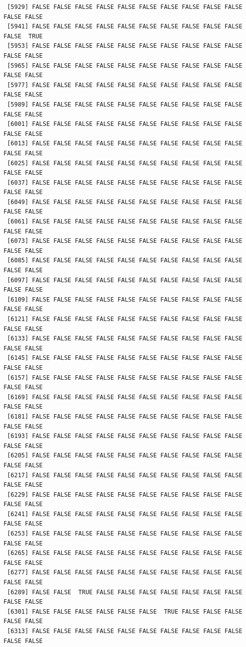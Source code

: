 \documentclass[
  a4paper,
  DIV=11,
  numbers=noendperiod]{scrartcl}
\begin{document}
\begin{verbatim}
 [5929] FALSE FALSE FALSE FALSE FALSE FALSE FALSE FALSE FALSE FALSE FALSE FALSE
 [5941] FALSE FALSE FALSE FALSE FALSE FALSE FALSE FALSE FALSE FALSE FALSE  TRUE
 [5953] FALSE FALSE FALSE FALSE FALSE FALSE FALSE FALSE FALSE FALSE FALSE FALSE
 [5965] FALSE FALSE FALSE FALSE FALSE FALSE FALSE FALSE FALSE FALSE FALSE FALSE
 [5977] FALSE FALSE FALSE FALSE FALSE FALSE FALSE FALSE FALSE FALSE FALSE FALSE
 [5989] FALSE FALSE FALSE FALSE FALSE FALSE FALSE FALSE FALSE FALSE FALSE FALSE
 [6001] FALSE FALSE FALSE FALSE FALSE FALSE FALSE FALSE FALSE FALSE FALSE FALSE
 [6013] FALSE FALSE FALSE FALSE FALSE FALSE FALSE FALSE FALSE FALSE FALSE FALSE
 [6025] FALSE FALSE FALSE FALSE FALSE FALSE FALSE FALSE FALSE FALSE FALSE FALSE
 [6037] FALSE FALSE FALSE FALSE FALSE FALSE FALSE FALSE FALSE FALSE FALSE FALSE
 [6049] FALSE FALSE FALSE FALSE FALSE FALSE FALSE FALSE FALSE FALSE FALSE FALSE
 [6061] FALSE FALSE FALSE FALSE FALSE FALSE FALSE FALSE FALSE FALSE FALSE FALSE
 [6073] FALSE FALSE FALSE FALSE FALSE FALSE FALSE FALSE FALSE FALSE FALSE FALSE
 [6085] FALSE FALSE FALSE FALSE FALSE FALSE FALSE FALSE FALSE FALSE FALSE FALSE
 [6097] FALSE FALSE FALSE FALSE FALSE FALSE FALSE FALSE FALSE FALSE FALSE FALSE
 [6109] FALSE FALSE FALSE FALSE FALSE FALSE FALSE FALSE FALSE FALSE FALSE FALSE
 [6121] FALSE FALSE FALSE FALSE FALSE FALSE FALSE FALSE FALSE FALSE FALSE FALSE
 [6133] FALSE FALSE FALSE FALSE FALSE FALSE FALSE FALSE FALSE FALSE FALSE FALSE
 [6145] FALSE FALSE FALSE FALSE FALSE FALSE FALSE FALSE FALSE FALSE FALSE FALSE
 [6157] FALSE FALSE FALSE FALSE FALSE FALSE FALSE FALSE FALSE FALSE FALSE FALSE
 [6169] FALSE FALSE FALSE FALSE FALSE FALSE FALSE FALSE FALSE FALSE FALSE FALSE
 [6181] FALSE FALSE FALSE FALSE FALSE FALSE FALSE FALSE FALSE FALSE FALSE FALSE
 [6193] FALSE FALSE FALSE FALSE FALSE FALSE FALSE FALSE FALSE FALSE FALSE FALSE
 [6205] FALSE FALSE FALSE FALSE FALSE FALSE FALSE FALSE FALSE FALSE FALSE FALSE
 [6217] FALSE FALSE FALSE FALSE FALSE FALSE FALSE FALSE FALSE FALSE FALSE FALSE
 [6229] FALSE FALSE FALSE FALSE FALSE FALSE FALSE FALSE FALSE FALSE FALSE FALSE
 [6241] FALSE FALSE FALSE FALSE FALSE FALSE FALSE FALSE FALSE FALSE FALSE FALSE
 [6253] FALSE FALSE FALSE FALSE FALSE FALSE FALSE FALSE FALSE FALSE FALSE FALSE
 [6265] FALSE FALSE FALSE FALSE FALSE FALSE FALSE FALSE FALSE FALSE FALSE FALSE
 [6277] FALSE FALSE FALSE FALSE FALSE FALSE FALSE FALSE FALSE FALSE FALSE FALSE
 [6289] FALSE FALSE  TRUE FALSE FALSE FALSE FALSE FALSE FALSE FALSE FALSE FALSE
 [6301] FALSE FALSE FALSE FALSE FALSE FALSE  TRUE FALSE FALSE FALSE FALSE FALSE
 [6313] FALSE FALSE FALSE FALSE FALSE FALSE FALSE FALSE FALSE FALSE FALSE FALSE

\end{verbatim}
\end{document}
